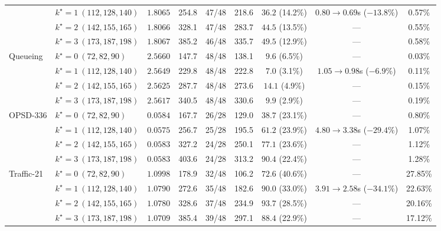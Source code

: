 \begin{table}[htbp]
{\begin{tabular}{llccccccc}
 & $k^\star\!=\!1\ (112,128,140)$ & $1.8065$ & 254.8 & 47/48 & 218.6 & $36.2$ (14.2\%) & $0.80\!\to\!0.69$s ($-13.8\%$) & 0.57\% \\
 & $k^\star\!=\!2\ (142,155,165)$ & $1.8066$ & 328.1 & 47/48 & 283.7 & $44.5$ (13.5\%) & --- & 0.55\% \\
 & $k^\star\!=\!3\ (173,187,198)$ & $1.8067$ & 385.2 & 46/48 & 335.7 & $49.5$ (12.9\%) & --- & 0.58\% \\
\midrule
\multirow{4}{*}{Queueing} & $k^\star\!=\!0\ (72,82,90)$ & $2.5660$ & 147.7 & 48/48 & 138.1 & $9.6$ (6.5\%) & --- & 0.03\% \\
 & $k^\star\!=\!1\ (112,128,140)$ & $2.5649$ & 229.8 & 48/48 & 222.8 & $7.0$ (3.1\%) & $1.05\!\to\!0.98$s ($-6.9\%$) & 0.11\% \\
 & $k^\star\!=\!2\ (142,155,165)$ & $2.5625$ & 287.7 & 48/48 & 273.6 & $14.1$ (4.9\%) & --- & 0.15\% \\
 & $k^\star\!=\!3\ (173,187,198)$ & $2.5617$ & 340.5 & 48/48 & 330.6 & $9.9$ (2.9\%) & --- & 0.19\% \\
\midrule
\multirow{4}{*}{OPSD-336} & $k^\star\!=\!0\ (72,82,90)$ & $0.0584$ & 167.7 & 26/28 & 129.0 & $38.7$ (23.1\%) & --- & 0.80\% \\
 & $k^\star\!=\!1\ (112,128,140)$ & $0.0575$ & 256.7 & 25/28 & 195.5 & $61.2$ (23.9\%) & $4.80\!\to\!3.38$s ($-29.4\%$) & 1.07\% \\
 & $k^\star\!=\!2\ (142,155,165)$ & $0.0583$ & 327.2 & 24/28 & 250.1 & $77.1$ (23.6\%) & --- & 1.12\% \\
 & $k^\star\!=\!3\ (173,187,198)$ & $0.0583$ & 403.6 & 24/28 & 313.2 & $90.4$ (22.4\%) & --- & 1.28\% \\
\midrule
\multirow{4}{*}{Traffic-21} & $k^\star\!=\!0\ (72,82,90)$ & $1.0998$ & 178.9 & 32/48 & 106.2 & $72.6$ (40.6\%) & --- & 27.85\% \\
 & $k^\star\!=\!1\ (112,128,140)$ & $1.0790$ & 272.6 & 35/48 & 182.6 & $90.0$ (33.0\%) & $3.91\!\to\!2.58$s ($-34.1\%$) & 22.63\% \\
 & $k^\star\!=\!2\ (142,155,165)$ & $1.0780$ & 328.6 & 37/48 & 234.9 & $93.7$ (28.5\%) & --- & 20.16\% \\
 & $k^\star\!=\!3\ (173,187,198)$ & $1.0709$ & 385.4 & 39/48 & 297.1 & $88.4$ (22.9\%) & --- & 17.12\% \\
\bottomrule
\end{tabular}%
}
\end{table}
